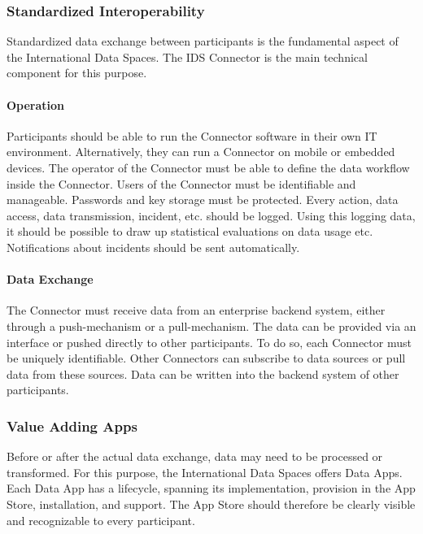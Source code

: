\subsubsection{Standardized Interoperability}
Standardized data exchange between participants is the fundamental aspect of the International Data Spaces. The IDS Connector is the main technical component for this purpose.

\paragraph{Operation\\}
Participants should be able to run the Connector software in their own IT environment. Alternatively, they can run a Connector on mobile or embedded devices. The operator of the Connector must be able to define the data workflow inside the Connector. Users of the Connector must be identifiable and manageable. Passwords and key storage must be protected. Every action, data access, data transmission, incident, etc. should be logged. Using this logging data, it should be possible to draw up statistical evaluations on data usage etc. Notifications about incidents should be sent automatically.


\paragraph{Data Exchange\\}
The Connector must receive data from an enterprise backend system, either through a push-mechanism or a pull-mechanism. The data can be provided via an interface or pushed directly to other participants. To do so, each Connector must be uniquely identifiable. Other Connectors can subscribe to data sources or pull data from these sources. Data can be written into the backend system of other participants.


\subsubsection{Value Adding Apps}
Before or after the actual data exchange, data may need to be processed or transformed. For this purpose, the International Data Spaces offers Data Apps. Each Data App has a lifecycle, spanning its implementation, provision in the App Store, installation, and support. The App Store should therefore be clearly visible and recognizable to every participant.

